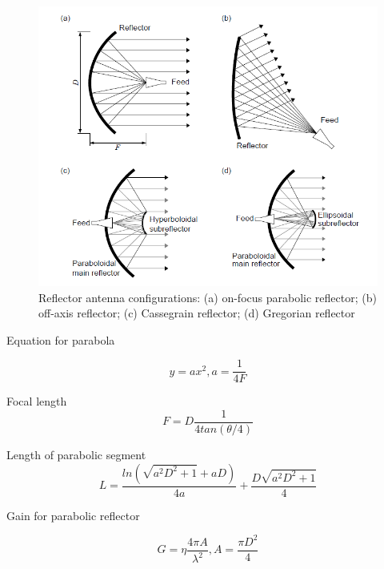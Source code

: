 \begin{figure}[H]
\centering 
\includegraphics[scale = 0.7]{figures/antennas/reflector/types}
\caption{Reflector antenna configurations: (a) on-focus parabolic reflector; (b) off-axis reflector; (c) Cassegrain reflector; (d) Gregorian reflector \citep{Imbriale2012}}
\label{fig:reflector_types}
\end{figure}

Equation for parabola

\begin{equation}
y=a x^2 , a = \frac{1}{4F}
\end{equation}
\label{eq:para1}

Focal length
\begin{equation}
F=D\frac{1}{4tan(\theta/4)}
\end{equation}
\label{eq:para2}

Length of parabolic segment
\begin{equation}
L=\frac{ln(\sqrt{a^2 D^2 +1}+a D)}{4a}+\frac{D\sqrt{a^2 D^2 +1}}{4}
\end{equation}
\label{eq:para3}

Gain for parabolic reflector

\begin{equation}
G=\eta \frac{4\pi A}{\lambda^2}, A = \frac{\pi D^2}{4}
\end{equation}
\label{eq:para4}

